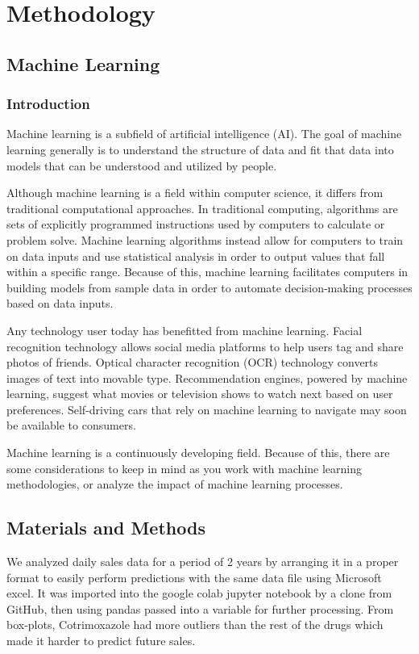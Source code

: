 \documentclass[12pt]{report}
\begin{document}
\chapter{Methodology}

\section{Machine Learning}

\subsection{Introduction}

Machine learning is a subfield of artificial intelligence (AI). The goal of machine learning generally is to understand the structure of data and fit that data into models that can be understood and utilized by people.

Although machine learning is a field within computer science, it differs from traditional computational approaches. In traditional computing, algorithms are sets of explicitly programmed instructions used by computers to calculate or problem solve. Machine learning algorithms instead allow for computers to train on data inputs and use statistical analysis in order to output values that fall within a specific range. Because of this, machine learning facilitates computers in building models from sample data in order to automate decision-making processes based on data inputs.

Any technology user today has benefitted from machine learning. Facial recognition technology allows social media platforms to help users tag and share photos of friends. Optical character recognition (OCR) technology converts images of text into movable type. Recommendation engines, powered by machine learning, suggest what movies or television shows to watch next based on user preferences. Self-driving cars that rely on machine learning to navigate may soon be available to consumers.

Machine learning is a continuously developing field. Because of this, there are some considerations to keep in mind as you work with machine learning methodologies, or analyze the impact of machine learning processes.\cite{12}


\section{Materials and Methods}

We analyzed daily sales data for a period of 2 years by arranging it in a proper format to easily perform predictions with the same data file using Microsoft excel. 
It was imported into the google colab jupyter notebook by a clone from GitHub, then using pandas passed into a variable for further processing.
From box-plots, Cotrimoxazole had more outliers than the rest of the drugs which made it harder to predict future sales.
 
\end{document}
